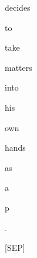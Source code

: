 \documentclass[varwidth=150mm]{standalone}
\begin{document}
\begin{CJK*}{UTF8}{gbsn}
{{{\colorbox{red!2.803907871246338}{\strut decides} \colorbox{red!0.0}{\strut to} \colorbox{red!0.0}{\strut take} \colorbox{red!0.0}{\strut matters} \colorbox{red!0.0}{\strut into} \colorbox{red!0.0}{\strut his} \colorbox{red!0.0}{\strut own} \colorbox{red!1.2502838373184204}{\strut hands} \colorbox{red!0.0}{\strut as} \colorbox{red!3.009241819381714}{\strut a} \colorbox{red!1.9428414106369019}{\strut p} \colorbox{red!42.31287384033203}{\strut .} \colorbox{red!5.244887351989746}{\strut [SEP]}
}}}
\end{CJK*}
\end{document}
